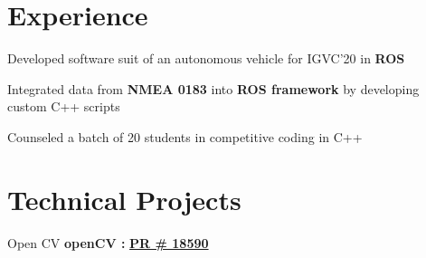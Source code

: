 \documentclass[letterpaper]{deedy-resume} %
\begin{document}
\begin{minipage}[t]{0.66\textwidth} %


\section{Experience}


\vspace{\topsep}
\begin{tightitemize}
\item Developed software suit of an autonomous vehicle for IGVC'20 in {\bf ROS}
\item Integrated data from {\bf{NMEA 0183}} into {\bf{ROS framework}} by developing \\ custom C++ scripts
\end{tightitemize}

\sectionspace %


\begin{tightitemize}
\item Counseled a batch of 20 students in competitive coding in C++
\end{tightitemize}


\sectionspace %

\section{Technical Projects}

\begin{tightitemize}
\item Open CV {\bf openCV :} \hspace{0.1cm} \href{https://github.com/opencv/opencv/pull/18590}{\textbf{PR \# 18590}}
\end{tightitemize}

\end{minipage}
\end{document}
